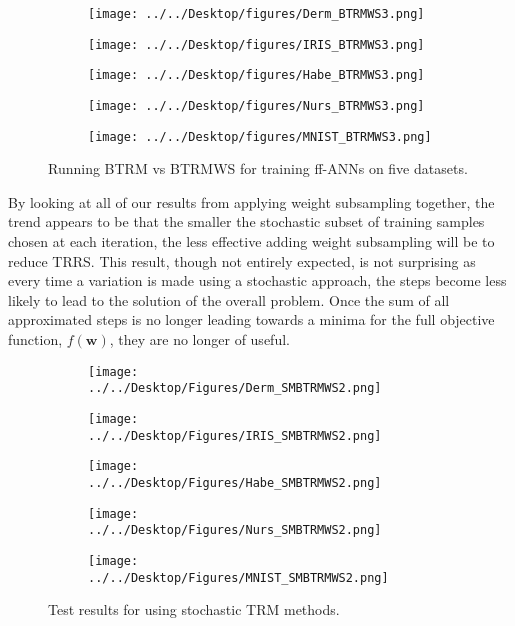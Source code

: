 \documentclass[letterpaper,12pt,titlepage,oneside,final]{book}
\begin{document}
	\begin{figure}
		\centering
		\begin{subfigure}{.45\textwidth}
			\texttt{[image: ../../Desktop/figures/Derm\_BTRMWS3.png]}
		\end{subfigure}
		\begin{subfigure}{.45\textwidth}
			\texttt{[image: ../../Desktop/figures/IRIS\_BTRMWS3.png]}
		\end{subfigure}
		\begin{subfigure}{.45\textwidth}
			\texttt{[image: ../../Desktop/figures/Habe\_BTRMWS3.png]}
		\end{subfigure}
		\begin{subfigure}{.45\textwidth}
			\texttt{[image: ../../Desktop/figures/Nurs\_BTRMWS3.png]}
		\end{subfigure}
		\begin{subfigure}{.45\textwidth}
			\texttt{[image: ../../Desktop/figures/MNIST\_BTRMWS3.png]}
		\end{subfigure}
		\caption{Running BTRM vs BTRMWS for training ff-ANNs on five datasets.}
		\label{figure:BTRMWS}
	\end{figure}
	

	
	By looking at all of our results from applying weight subsampling together, the trend appears to be that the smaller the stochastic subset of training samples chosen at each iteration, the less effective adding weight subsampling will be to reduce TRRS. This result, though not entirely expected, is not surprising as every time a variation is made using a stochastic approach, the steps become less likely to lead to the solution of the overall problem. Once the sum of all approximated steps is no longer leading towards a minima for the full objective function, $f(\mathbf{w})$, they are no longer of useful.
	
	\begin{figure}
		\centering
		\begin{subfigure}{.45\textwidth}
			\texttt{[image: ../../Desktop/Figures/Derm\_SMBTRMWS2.png]}
		\end{subfigure}
		\begin{subfigure}{.45\textwidth}
			\texttt{[image: ../../Desktop/Figures/IRIS\_SMBTRMWS2.png]}
		\end{subfigure}
		\begin{subfigure}{.45\textwidth}
			\texttt{[image: ../../Desktop/Figures/Habe\_SMBTRMWS2.png]}
		\end{subfigure}
		\begin{subfigure}{.45\textwidth}
			\texttt{[image: ../../Desktop/Figures/Nurs\_SMBTRMWS2.png]}
		\end{subfigure}
		\begin{subfigure}{.45\textwidth}
			\texttt{[image: ../../Desktop/Figures/MNIST\_SMBTRMWS2.png]}
		\end{subfigure}
		\caption{Test results for using stochastic TRM methods.}
		\label{figure:SMBTRMWS}
	\end{figure}
	
\end{document}
